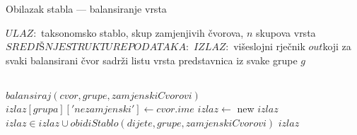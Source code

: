 \begin{algorithm}[h!]

\centering
\caption{Obilazak stabla --- balansiranje vrsta}
\label{algo:balance}

\begin{algorithmic}

\State $ULAZ:$ taksonomsko stablo, skup zamjenjivih čvorova, $n$ skupova vrsta
\State $SREDIŠNJE STRUKTURE PODATAKA:$ %
\State $IZLAZ:$ višeslojni rječnik $out$koji za svaki balansirani čvor sadrži
listu vrsta predstavnica iz svake grupe $g$  

     \\
        \Return $balansiraj(cvor, grupe, zamjenskiCvorovi)$
    \Else
                \State $izlaz[grupa]['nezamjenski'] \gets cvor.ime$
            \EndFor
        \Else
            \State $izlaz \gets$ new $izlaz$
                    \State $izlaz \in izlaz \cup obidiStablo(dijete, grupe,
zamjenskiCvorovi)$
                \EndIf
            \EndFor
        \EndIf
    \EndIf
    \Return $izlaz$
\EndFunction

\end{algorithmic}
\end{algorithm}  
